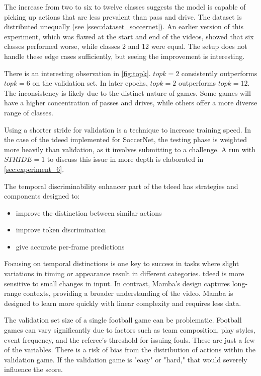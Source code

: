 The increase from two to six to twelve classes suggests the model is capable of picking up actions that are less prevalent than pass and drive. The dataset is distributed unequally (see \cref{ssec:dataset_soccernet}). An earlier version of this experiment, which was flawed at the start and end of the videos, showed that six classes performed worse, while classes 2 and 12 were equal. The setup does not handle these edge cases sufficiently, but seeing the improvement is interesting. 

There is an interesting observation in \cref{fig:topk}. $topk=2$ consistently outperforms $topk=6$ on the validation set. In later epochs, $topk=2$ outperforms $topk=12$. The inconsistency is likely due to the distinct nature of games. Some games will have a higher concentration of passes and drives, while others offer a more diverse range of classes.

Using a shorter stride for validation is a technique to increase training speed. In the case of the \acrshort{tdeed} implemented for SoccerNet, the testing phase is weighted more heavily than validation, as it involves submitting to a challenge. A run with \(STRIDE=1\) to discuss this issue in more depth is elaborated in \cref{sec:experiment_6}. 

The temporal discriminability enhancer part of the \acrlong{tdeed} has strategies and components designed to: 
\begin{itemize}
    \item improve the distinction between similar actions
    \item improve token discrimination
    \item give accurate per-frame predictions
\end{itemize}

Focusing on temporal distinctions is one key to success in tasks where slight variations in timing or appearance result in different categories. \acrshort{tdeed} is more sensitive to small changes in input. In contrast, Mamba's design captures long-range contexts, providing a broader understanding of the video. Mamba is designed to learn more quickly with linear complexity and requires less data.

The validation set size of a single football game can be problematic. Football games can vary significantly due to factors such as team composition, play styles, event frequency, and the referee's threshold for issuing fouls. These are just a few of the variables. There is a risk of bias from the distribution of actions within the validation game. If the validation game is "easy" or "hard," that would severely influence the score. 

